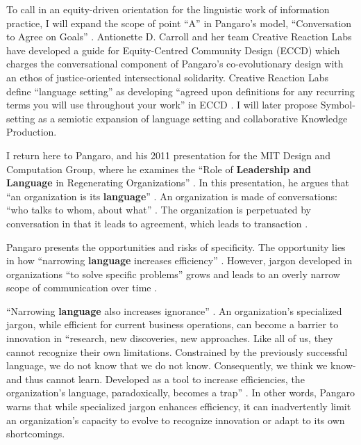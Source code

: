 To call in an equity-driven orientation for the linguistic work of information practice, I will expand the scope of point ``A” in Pangaro’s model, ``Conversation to Agree on Goals” \citep[p. 185]{pangaro_design_2011}. Antionette D. Carroll and her team Creative Reaction Labs have developed a guide for Equity-Centred Community Design (ECCD) which charges the conversational component of Pangaro’s co-evolutionary design with an ethos of justice-oriented intersectional solidarity. Creative Reaction Labs define ``language setting” as developing ``agreed upon definitions for any recurring terms you will use throughout your work” in ECCD \citep[p. 8-9]{creative_reaction_lab_equity-centered_2018}. I will later propose Symbol-setting as a semiotic expansion of language setting and collaborative Knowledge Production.

I return here to Pangaro, and his 2011 presentation for the MIT Design and Computation Group, where he examines the ``Role of \textbf{Leadership and Language} in Regenerating Organizations” \citep[p. 142]{pangaro_design_2011}. In this presentation, he argues that ``an organization is its \textbf{language}” \citep[p. 143]{pangaro_design_2011}. An organization is made of conversations: ``who talks to whom, about what” \citep[p. 143]{pangaro_design_2011}. The organization is perpetuated by conversation in that it leads to agreement, which leads to transaction \citep[p. 143]{pangaro_design_2011}.

Pangaro presents the opportunities and risks of specificity. The opportunity lies in how ``narrowing \textbf{language} increases efficiency” \citep[p. 144]{pangaro_design_2011}. However, jargon developed in organizations ``to solve specific problems” grows and leads to an overly narrow scope of communication over time \citep[p. 144]{pangaro_design_2011}. 

``Narrowing \textbf{language} also increases ignorance” \citep[p. 145]{pangaro_design_2011}. An organization’s specialized jargon, while efficient for current business operations, can become a barrier to innovation in “research, new discoveries, new approaches. Like all of us, they cannot recognize their own limitations. Constrained by the previously successful language, we do not know that we do not know. Consequently, we think we know- and thus cannot learn. Developed as a tool to increase efficiencies, the organization's language, paradoxically, becomes a trap” \citep[p. 145]{pangaro_design_2011}. In other words, Pangaro warns that while specialized jargon enhances efficiency, it can inadvertently limit an organization's capacity to evolve to recognize innovation or adapt to its own shortcomings. 

